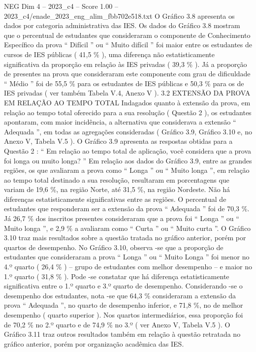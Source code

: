 \begin{textsample}{NEG Dim 4 – 2023\_c4 – Score 1.00 – 2023\_c4/enade\_2023\_eng\_alim\_fbb702e518.txt}
O Gráfico 3.8 apresenta os dados por categoria administrativa das IES.
Os dados do Gráfico 3.8 mostram que o percentual de estudantes que consideraram o componente de Conhecimento Específico da prova “ Difícil ” ou “ Muito difícil ” foi maior entre os estudantes de cursos de IES públicas ( 41,5 \% ), uma diferença não estatisticamente significativa da proporção em relação às IES privadas ( 39,3 \% ).
Já a proporção de presentes na prova que consideraram este componente com grau de dificuldade “ Médio ” foi de 55,5 \% para os estudantes de IES públicas e 50,3 \% para os de IES privadas ( ver também Tabela V.4, Anexo V ). 3.2 EXTENSÃO DA PROVA EM RELAÇÃO AO TEMPO TOTAL Indagados quanto à extensão da prova, em relação ao tempo total oferecido para a sua resolução ( Questão 2 ), os estudantes apontaram, com maior incidência, a alternativa que considerava a extensão “ Adequada ”, em todas as agregações consideradas ( Gráfico 3.9, Gráfico 3.10 e, no Anexo V, Tabela V.5 ).
O Gráfico 3.9 apresenta as respostas obtidas para a Questão 2 : “ Em relação ao tempo total de aplicação, você considera que a prova foi longa ou muito longa? ” Em relação aos dados do Gráfico 3.9, entre as grandes regiões, os que avaliaram a prova como “ Longa ” ou “ Muito longa ”, em relação ao tempo total destinado a sua resolução, resultaram em porcentagens que variam de 19,6 \%, na região Norte, até 31,5 \%, na região Nordeste.
Não há diferenças estatisticamente significativas entre as regiões.
O percentual de estudantes que responderam ser a extensão da prova “ Adequada ” foi de 70,3 \%.
Já 26,7 \% dos inscritos presentes consideraram que a prova foi “ Longa ” ou “ Muito longa ”, e 2,9 \% a avaliaram como “ Curta ” ou “ Muito curta ”.
O Gráfico 3.10 traz mais resultados sobre a questão tratada no gráfico anterior, porém por quartos de desempenho.
No Gráfico 3.10, observa -se que a proporção de estudantes que consideraram a prova “ Longa ” ou “ Muito Longa ” foi menor no 4.º quarto ( 26,4 \% ) – grupo de estudantes com melhor desempenho – e maior no 1.º quarto ( 31,8 \% ).
Pode -se constatar que há diferença estatisticamente significativa entre o 1.º quarto e 3.º quarto de desempenho.
Considerando -se o desempenho dos estudantes, nota -se que 64,3 \% consideraram a extensão da prova “ Adequada ”, no quarto de desempenho inferior, e 71,8 \%, no de melhor desempenho ( quarto superior ).
Nos quartos intermediários, essa proporção foi de 70,2 \% no 2.º quarto e de 74,9 \% no 3.º ( ver Anexo V, Tabela V.5 ).
O Gráfico 3.11 traz outros resultados também em relação à questão retratada no gráfico anterior, porém por organização acadêmica das IES.

\end{textsample}
